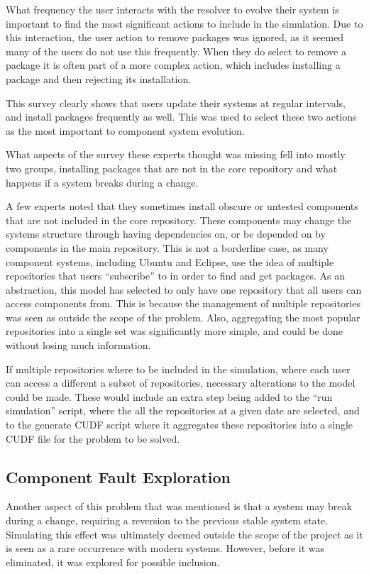 What frequency the user interacts with the resolver to evolve their system is important to find the most significant actions to include in the simulation.
Due to this interaction, the user action to remove packages was ignored, as it seemed many of the users do not use this frequently.
When they do select to remove a package it is often part of a more complex action, which includes installing a package and then rejecting its installation.

This survey clearly shows that users update their systems at regular intervals, and install packages frequently as well.
This was used to select these two actions as the most important to component system evolution. 

What aspects of the survey these experts thought was missing fell into mostly two groups,
installing packages that are not in the core repository and what happens if a system breaks during a change.

A few experts noted that they sometimes install obscure or untested components that are not included in the core repository.
These components may change the systems structure through having dependencies on, or be depended on by components in the main repository.
This is not a borderline case, as many component systems, including Ubuntu and Eclipse, use the idea of multiple repositories that users ``subscribe'' to in order to find and get packages.
As an abstraction, this model has selected to only have one repository that all users can access components from.
This is because the management of multiple repositories was seen as outside the scope of the problem.
Also, aggregating the most popular repositories into a single set was significantly more simple, and could be done without losing much information.  

If multiple repositories where to be included in the simulation, where each user can access a different a subset of repositories, necessary alterations to the model could be made.
These would include an extra step being added to the ``run simulation'' script, where the all the repositories at a given date are selected, and to the generate CUDF script where
it aggregates these repositories into a single CUDF file for the problem to be solved.

\subsection{Component Fault Exploration}
Another aspect of this problem that was mentioned is that a system may break during a change, requiring a reversion to the previous stable system state.
Simulating this effect was ultimately deemed outside the scope of the project as it is seen as a rare occurrence with modern systems.
However, before it was eliminated, it was explored for possible inclusion.

